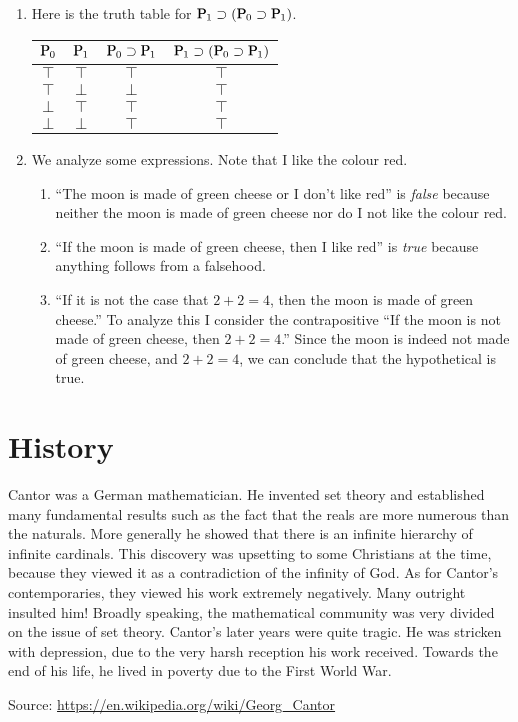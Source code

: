 \documentclass[11pt,letterpaper]{article}
\begin{document}
\begin{enumerate}
  \item
    Here is the truth table for
    $\mathqd{P}_1 \supset (\mathqd{P}_0 \supset \mathqd{P}_1)$.

    \begin{tabular}{c c | c c}
      $\mathqd{P}_0$ & $\mathqd{P}_1$ & $\mathqd{P}_0 \supset \mathqd{P}_1$ & $\mathqd{P}_1 \supset (\mathqd{P}_0 \supset \mathqd{P}_1)$ \\ \hline
      $\top$ & $\top$ & $\top$ & $\top$ \\
      $\top$ & $\bot$ & $\bot$ & $\top$ \\
      $\bot$ & $\top$ & $\top$ & $\top$ \\
      $\bot$ & $\bot$ & $\top$ & $\top$
    \end{tabular}

  \item
    We analyze some expressions.
    Note that I like the colour red.

    \begin{enumerate}
      \item
        ``The moon is made of green cheese or I don't like red''
        is \emph{false} because neither the moon is made of green cheese nor do
        I not like the colour red.

      \item
        ``If the moon is made of green cheese, then I like red''
        is \emph{true} because anything follows from a falsehood.

      \item
        ``If it is not the case that $2 + 2 = 4$, then the moon is made of
        green cheese.''
        To analyze this I consider the contrapositive
        ``If the moon is not made of green cheese, then $2 + 2 = 4$.''
        Since the moon is indeed not made of green cheese,
        and $2 + 2 = 4$, we can conclude that the hypothetical is true.
    \end{enumerate}
\end{enumerate}

\section{History}

Cantor was a German mathematician.
He invented set theory and established many fundamental results such as the
fact that the reals are more numerous than the naturals.
More generally he showed that there is an infinite hierarchy of infinite
cardinals.
This discovery was upsetting to some Christians at the time, because they
viewed it as a contradiction of the infinity of God.
As for Cantor's contemporaries, they viewed his work extremely negatively.
Many outright insulted him!
Broadly speaking, the mathematical community was very divided on the issue of
set theory.
Cantor's later years were quite tragic.
He was stricken with depression, due to the very harsh reception his work
received.
Towards the end of his life, he lived in poverty due to the First World War.

Source: \url{https://en.wikipedia.org/wiki/Georg_Cantor}
\end{document}
